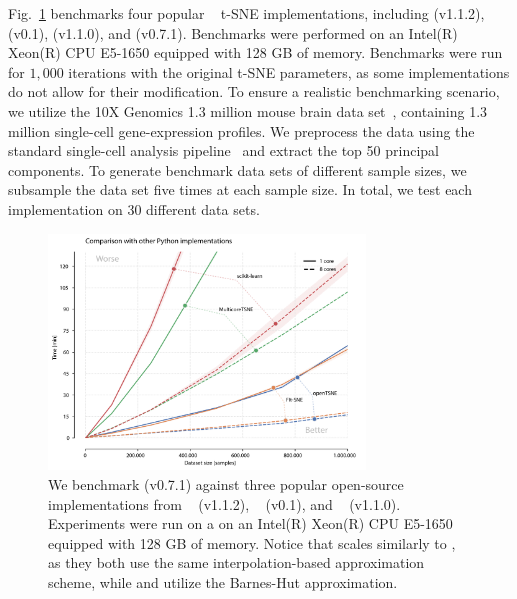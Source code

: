 \documentclass[article]{jss}
\newcommand{\opentsne}{\pkg{openTSNE}\xspace}
\begin{document}
Fig.~\ref{fig:benchmarks_py} benchmarks four popular ~\citep{vanrossum1995python} t-SNE implementations, including  (v1.1.2),  (v0.1),  (v1.1.0), and \opentsne (v0.7.1). Benchmarks were performed on an Intel(R) Xeon(R) CPU E5-1650 equipped with 128 GB of memory. Benchmarks were run for $1,000$ iterations with the original t-SNE parameters, as some implementations do not allow for their modification. To ensure a realistic benchmarking scenario, we utilize the 10X Genomics 1.3 million mouse brain data set~\citep{cao2019single}, containing 1.3 million single-cell gene-expression profiles. We preprocess the data using the standard single-cell analysis pipeline~\citep{kiselev2019challenges} and extract the top 50 principal components. To generate benchmark data sets of different sample sizes, we subsample the data set five times at each sample size. In total, we test each implementation on 30 different data sets.

\begin{figure}[ht]
  \centering
  \includegraphics[width=0.75\textwidth]{benchmarks_python-final}
  \caption{\label{fig:benchmarks_py}
  We benchmark \opentsne (v0.7.1) against three popular open-source
  implementations from ~\citep{pedregosa2011scikit}
  (v1.1.2), ~\citep{Ulyanov2016} (v0.1), and
  ~\citep{linderman2019fast} (v1.1.0). Experiments were run on a
  on an Intel(R) Xeon(R) CPU E5-1650 equipped with 128 GB of memory. Notice
  that \opentsne scales similarly to , as they both use the
  same interpolation-based approximation scheme, while  and
   utilize the Barnes-Hut approximation.
}
\end{figure}
\end{document}

